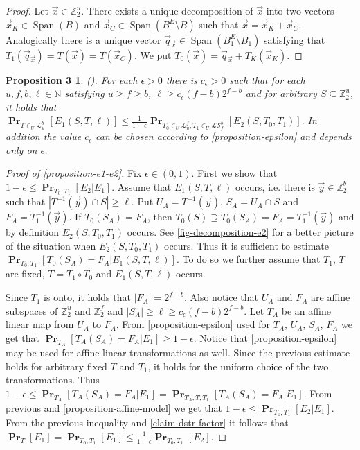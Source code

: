 ﻿\documentclass[review]{elsarticle}
\newcommand{\vecspace}[2]{\mathbb{Z}_{#1}^{#2}}
\newcommand{\binvecspace}[1]{\vecspace{2}{#1}}
\newcommand{\linearmaps}[2]{\mathcal{L}_{#1}^{#2}}
\newcommand{\surjectivelinearmaps}[2]{\mathcal{LS}_{#1}^{#2}}
\newcommand{\probs}[2]{\operatorname{\mathbf{Pr}}_{{#1}}\left[{#2}\right]}
\newtheorem*{propositionrep*}{Proposition 3}
\begin{document}
\begin{appendix}
\begin{proof}
Let $\vec{x} \in \binvecspace{u}$.
There exists a unique decomposition of $\vec{x}$ into two vectors $\vec{x}_K \in \operatorname{Span}(B)$ and $\vec{x}_C \in \operatorname{Span}(B^E \setminus B)$ such that $\vec{x} = \vec{x}_K + \vec{x}_C$.
Analogically there is a unique vector $\vec{q}_{\vec{x}} \in \operatorname{Span}(B_1^E \setminus B_1)$ satisfying that $T_1(\vec{q}_{\vec{x}}) = T(\vec{x}) = T(\vec{x}_C)$.
We put $T_0(\vec{x}) = \vec{q}_{\vec{x}} + T_K(\vec{x}_K)$.
\end{proof}

\begin{propositionrep*} \emph{({\cite[Proposition 3.2, p.~11]{alonetal}}).}
For each $\epsilon > 0$ there is $c_\epsilon > 0$ such that for each $u, f, b, \ell \in \mathbb{N}$ satisfying $u \geq f \geq b$, $\ell \geq c_\epsilon (f - b)2^{f-b}$ and for arbitrary $S \subseteq \binvecspace{u}$, it holds that
$
\probs{T \in_U \linearmaps{u}{b}}{E_1(S, T, \ell)} \leq \frac{1}{1 - \epsilon}\probs{T_0 \in_U \linearmaps{u}{f}, T_1 \in_U \surjectivelinearmaps{f}{b}}{E_2(S, T_0, T_1)}.
$
In addition the value $c_\epsilon$ can be chosen according to \cref{proposition-epsilon} and depends only on $\epsilon$.
\end{propositionrep*}
\begin{proof}[Proof of \cref{proposition-e1-e2}]
Fix $\epsilon \in (0, 1)$.
First we show that $1 - \epsilon \leq \probs{T_0, T_1}{E_2 | E_1}$.
Assume that $E_1(S, T, \ell)$ occurs, i.e. there is $\vec{y} \in \binvecspace{b}$ such that $|T^{-1}(\vec{y}) \cap S| \geq \ell$.
Put $U_A = T^{-1}(\vec{y})$, $S_A = U_A \cap S$ and $F_A = T_1^{-1}(\vec{y})$.
If $T_0(S_A) = F_A$, then $T_0(S) \supseteq T_0(S_A) = F_A = T_1^{-1}(\vec{y})$ and by definition $E_2(S, T_0, T_1)$ occurs.
See \cref{fig-decomposition-e2} for a better picture of the situation when $E_2(S, T_0, T_1)$ occurs.
Thus it is sufficient to estimate $\probs{T_0, T_1}{T_0(S_A) = F_A | E_1(S, T, \ell)}$.
To do so we further assume that $T_1$, $T$ are fixed, $T = T_1 \circ T_0$ and $E_1(S, T, \ell)$ occurs.

Since $T_1$ is onto, it holds that $|F_A| = 2^{f-b}$.
Also notice that $U_A$ and $F_A$ are affine subspaces of $\binvecspace{u}$ and $\binvecspace{f}$ and $|S_A| \geq \ell \geq c_\epsilon (f - b)2^{f-b}$.
Let $T_A$ be an affine linear map from $U_A$ to $F_A$.
From \cref{proposition-epsilon} used for $T_A$, $U_A$, $S_A$, $F_A$ we get that $\probs{T_A}{T_A(S_A) = F_A | E_1} \geq 1 - \epsilon$.
Notice that \cref{proposition-epsilon} may be used for affine linear transformations as well.
Since the previous estimate holds for arbitrary fixed $T$ and $T_1$, it holds for the uniform choice of the two transformations. Thus $1 - \epsilon \leq \probs{T_A}{T_A(S_A) = F_A | E_1} = \probs{T_A, T, T_1}{T_A(S_A) = F_A | E_1}$.
From previous and \cref{proposition-affine-model} we get that $1 - \epsilon \leq \probs{T_0, T_1}{E_2 | E_1}$.
From the previous inequality and \cref{claim-dstr-factor} it follows that $\probs{T}{E_1} = \probs{T_0, T_1}{E_1} \leq \frac{1}{1-\epsilon}\probs{T_0, T_1}{E_2}$.
\end{proof}
\end{appendix}
\end{document}
